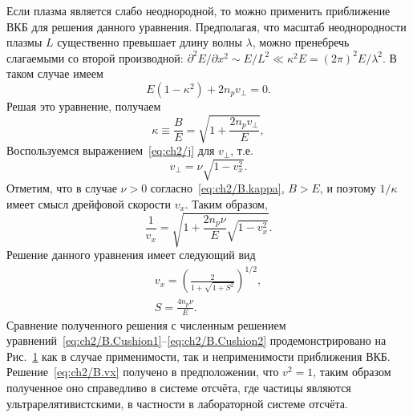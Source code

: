 Если плазма является слабо неоднородной, то можно применить приближение ВКБ для решения данного уравнения.
Предполагая, что масштаб неоднородности плазмы $L$ существенно превышает длину волны $\lambda$, можно пренебречь слагаемыми со второй производной: $\partial^2E/\partial x^2 \sim E/L^2 \ll \kappa^2 E = (2\pi)^2E/\lambda^2$.
В таком случае имеем
\begin{equation}
    E(1-\kappa^2)+2 n_p v_{\perp} = 0.
\end{equation}
Решая это уравнение, получаем
\begin{equation}
    \label{eq:ch2/B.kappa}
    \kappa \equiv \frac{B}{E}=\sqrt{1+\frac{2 n_p v_{\perp}}{E}},
\end{equation}
Воспользуемся выражением~\eqref{eq:ch2/j} для $v_\perp$, т.е.
\begin{equation}
v_\perp = \nu \sqrt{1-v_x^2}.
\label{vp}
\end{equation}
Отметим, что в случае $\nu>0$ согласно~\eqref{eq:ch2/B.kappa}, $B>E$, и поэтому $1/\kappa$ имеет смысл дрейфовой скорости $v_x$.
Таким образом,
\begin{equation}
    \frac{1}{v_x}=\sqrt{1+\frac{2n_p\nu}{E}\sqrt{1-v_x^2}} .
\end{equation}
Решение данного уравнения имеет следующий вид
\begin{gather}
    \label{eq:ch2/B.vx}
    v_x= {\left( \frac{2}{1+\sqrt{1+S^2}} \right)}^{1/2},\\
    S=\frac{4n_p\nu}{E}.
\end{gather}
Сравнение полученного решения с численным решением уравнений~\eqref{eq:ch2/B.Cushion1}--\eqref{eq:ch2/B.Cushion2} продемонстрировано на Рис.~\ref{fig.ch2/sec3/ED} как в случае применимости, так и неприменимости приближения ВКБ.
Решение~\eqref{eq:ch2/B.vx} получено в предположении, что $v^2 = 1$, таким образом полученное оно справедливо в системе отсчёта, где частицы являются ультрарелятивистскими, в частности в лабораторной системе отсчёта. 

\begin{figure}
	\caption[Дрейфовая скорость частиц в электрон-позитронной плазме]{\label{fig.ch2/sec3/ED} 
    }
\end{figure}

